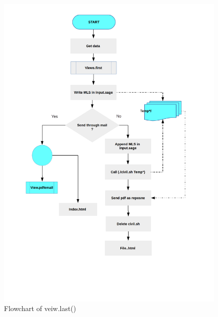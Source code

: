 \begin{figure}[H]
\centering \includegraphics[scale=0.27]{images/flowchartmatrix.png}
\caption{Flowchart of veiw.last()}
\label{fig:FD2}
\end{figure}
